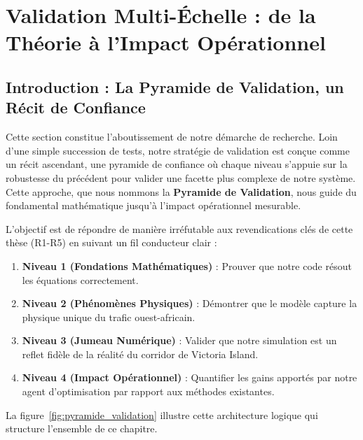 
\section{Validation Multi-Échelle : de la Théorie à l'Impact Opérationnel}
\label{sec:validation_multiechelle}

\subsection{Introduction : La Pyramide de Validation, un Récit de Confiance}
\label{sec:pyramide_validation}

Cette section constitue l'aboutissement de notre démarche de recherche. Loin d'une simple succession de tests, notre stratégie de validation est conçue comme un récit ascendant, une pyramide de confiance où chaque niveau s'appuie sur la robustesse du précédent pour valider une facette plus complexe de notre système. Cette approche, que nous nommons la \textbf{Pyramide de Validation}, nous guide du fondamental mathématique jusqu'à l'impact opérationnel mesurable.

L'objectif est de répondre de manière irréfutable aux revendications clés de cette thèse (R1-R5) en suivant un fil conducteur clair :
\begin{enumerate}
    \item \textbf{Niveau 1 (Fondations Mathématiques)} : Prouver que notre code résout les équations correctement.
    \item \textbf{Niveau 2 (Phénomènes Physiques)} : Démontrer que le modèle capture la physique unique du trafic ouest-africain.
    \item \textbf{Niveau 3 (Jumeau Numérique)} : Valider que notre simulation est un reflet fidèle de la réalité du corridor de Victoria Island.
    \item \textbf{Niveau 4 (Impact Opérationnel)} : Quantifier les gains apportés par notre agent d'optimisation par rapport aux méthodes existantes.
\end{enumerate}

La figure~\ref{fig:pyramide_validation} illustre cette architecture logique qui structure l'ensemble de ce chapitre.

